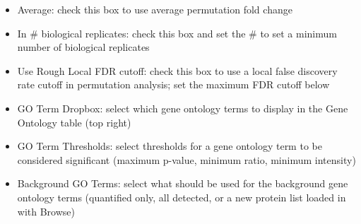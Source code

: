 \begin{itemize}
\item Average: check this box to use average permutation fold change
\item In \# biological replicates: check this box and set the \# to set a minimum number of biological replicates
\item Use Rough Local FDR cutoff: check this box to use a local false discovery rate cutoff in permutation analysis; set the maximum FDR cutoff below
\item GO Term Dropbox: select which gene ontology terms to display in the Gene Ontology table (top right)
\item GO Term Thresholds: select thresholds for a gene ontology term to be considered significant (maximum p-value, minimum ratio, minimum intensity)
\item Background GO Terms: select what should be used for the background gene ontology terms (quantified only, all detected, or a new protein list loaded in with Browse)
\end{itemize}
\pagebreak
